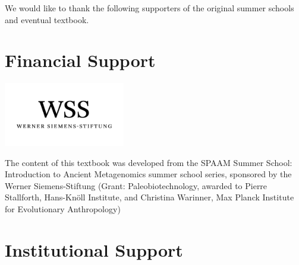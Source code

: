 \documentclass[
  letterpaper,
]{book}
\begin{document}

We would like to thank the following supporters of the original summer
schools and eventual textbook.

\hypertarget{financial-support}{%
\section*{\texorpdfstring{\textbf{Financial
Support}}{Financial Support}}\label{financial-support}}


\includegraphics[width=2.08333in,height=\textheight]{assets/images/logos/WSS_Logo_16mm_600_rgb.png}

The content of this textbook was developed from the SPAAM Summer School:
Introduction to Ancient Metagenomics summer school series, sponsored by
the Werner Siemens-Stiftung (Grant: Paleobiotechnology, awarded to
Pierre Stallforth, Hans-Knöll Institute, and Christina Warinner, Max
Planck Institute for Evolutionary Anthropology)

\hypertarget{institutional-support}{%
\section*{\texorpdfstring{\textbf{Institutional
Support}}{Institutional Support}}\label{institutional-support}}

\end{document}
